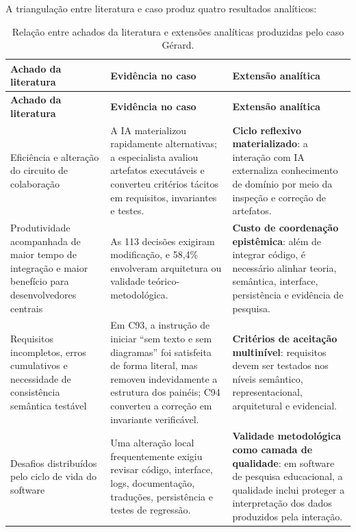 \documentclass[preprint,12pt,authoryear]{elsarticle}
\begin{document}
A triangulação entre literatura e caso produz quatro resultados analíticos:

\begingroup
\small
\setlength{\tabcolsep}{4pt}
\begin{longtable}{p{3.0cm}p{5.25cm}p{5.25cm}}
\caption{Relação entre achados da literatura e extensões analíticas produzidas pelo caso Gérard.}\label{tab:literatura-extensoes}\\
\toprule
\textbf{Achado da literatura} & \textbf{Evidência no caso} & \textbf{Extensão analítica}\\
\midrule
\endfirsthead
\toprule
\textbf{Achado da literatura} & \textbf{Evidência no caso} & \textbf{Extensão analítica}\\
\midrule
\endhead
Eficiência e alteração do circuito de colaboração \citep{ulfsnes2024transforming} & A IA materializou rapidamente alternativas; a especialista avaliou artefatos executáveis e converteu critérios tácitos em requisitos, invariantes e testes. & \textbf{Ciclo reflexivo materializado}: a interação com IA externaliza conhecimento de domínio por meio da inspeção e correção de artefatos.\\
Produtividade acompanhada de maior tempo de integração e maior benefício para desenvolvedores centrais \citep{song2024impact} & As 113 decisões exigiram modificação, e 58,4\% envolveram arquitetura ou validade teórico-metodológica. & \textbf{Custo de coordenação epistêmica}: além de integrar código, é necessário alinhar teoria, semântica, interface, persistência e evidência de pesquisa.\\
Requisitos incompletos, erros cumulativos e necessidade de consistência semântica testável \citep{zhang2024agilegen} & Em C93, a instrução de iniciar ``sem texto e sem diagramas'' foi satisfeita de forma literal, mas removeu indevidamente a estrutura dos painéis; C94 converteu a correção em invariante verificável. & \textbf{Critérios de aceitação multinível}: requisitos devem ser testados nos níveis semântico, representacional, arquitetural e evidencial.\\
Desafios distribuídos pelo ciclo de vida do software \citep{gao2024challenges} & Uma alteração local frequentemente exigiu revisar código, interface, logs, documentação, traduções, persistência e testes de regressão. & \textbf{Validade metodológica como camada de qualidade}: em software de pesquisa educacional, a qualidade inclui proteger a interpretação dos dados produzidos pela interação.\\
\bottomrule
\end{longtable}
\endgroup
\end{document}
